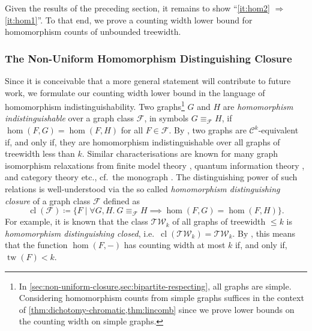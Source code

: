 \documentclass[11pt, DIV=15]{scrarticle}
\theoremstyle{definition}
\theoremstyle{plain}
\theoremstyle{remark}
\DeclareMathOperator{\tw}{tw}
\DeclareMathOperator{\cl}{cl}
\begin{document}
	Given the results of the preceding section,  it remains to show \enquote{\ref{it:hom2} $\Rightarrow$ \ref{it:hom1}}.
	To that end, 
	we prove a counting width lower bound for homomorphism counts of unbounded treewidth.
	
	
	\subsubsection{The Non-Uniform Homomorphism Distinguishing Closure}
	\label{sec:non-uniform-closure}
	
	Since it is conceivable that a more general statement will contribute to future work,
	we formulate our counting width lower bound in the language of homomorphism indistinguishability.
	Two graphs\footnote{In \cref{sec:non-uniform-closure,sec:bipartite-respecting}, all graphs are simple. 
		Considering homomorphism counts from simple graphs suffices in the context of 
		 \cref{thm:dichotomy-chromatic,thm:lincomb} since we prove lower bounds on the counting width on simple graphs.} $G$ and $H$ are \emph{homomorphism indistinguishable} over a graph class $\mathcal{F}$, in symbols $G \equiv_{\mathcal{F}} H$,
	if $\hom(F, G) = \hom(F, H)$ for all $F \in \mathcal{F}$.
	By \cite{dvorak_recognizing_2010,dell-grohe-rattan},
	two graphs are $\mathcal{C}^k$-equivalent
	if, and only if,
	they are homomorphism indistinguishable over all graphs of treewidth less than $k$.
	Similar characterisations are known for many graph isomorphism relaxations from finite model theory \cite{grohe_counting_2020,fluck_going_2024}, quantum information theory \cite{mancinska_quantum_2020}, and category theory \cite{dawar_lovasz-type_2021,montacute_pebble-relation_2024} etc.,
	cf.\ the monograph \cite{seppelt_homomorphism_2024}.
	The distinguishing power of such relations is well-understood via the so called \emph{homomorphism distinguishing closure} \cite{roberson_oddomorphisms_2022} of a graph class $\mathcal{F}$ defined as
	\[
		\cl(\mathcal{F}) \coloneqq \{F \mid \forall G, H.\ G \equiv_{\mathcal{F}} H \implies \hom(F, G) = \hom(F, H)\}.
	\]
	For example, it is known \cite{neuen_homomorphism-distinguishing_2024} that the class  $\mathcal{TW}_k$ of all graphs of treewidth $\leq k$ is \emph{homomorphism distinguishing closed}, i.e.\ $\cl(\mathcal{TW}_k) = \mathcal{TW}_k$.
	By \cite{dvorak_recognizing_2010},
	this means that the function $\hom(F, -)$ has counting width 
	at most $k$ if, and only if, $\tw(F) < k$.
	
\end{document}
